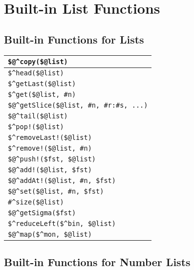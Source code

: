 \chapter{Built-in List Functions}

\section{Built-in Functions for \fsm{} Lists}

\begin{tabular}{|l|}
\hline
\verb!$@^copy($@list)! \\
\hline
\verb!$^head($@list)! \\
\verb!$^getLast($@list)! \\
\verb!$^get($@list, #n)! \\
\verb!$@^getSlice($@list, #n, #r:#s, ...)! \\
\verb!$@^tail($@list)! \\
\hline
\verb+$^pop!($@list)+ \\
\verb+$^removeLast!($@list)+ \\
\verb+$^remove!($@list, #n)+ \\
\hline
\verb+$@^push!($fst, $@list)+ \\
\verb+$@^add!($@list, $fst)+ \\
\verb+$@^addAt!($@list, #n, $fst)+ \\
\hline
\verb!$@^set($@list, #n, $fst)! \\
\hline
\verb!#^size($@list)! \\
\verb!$@^getSigma($fst)! \\
\hline
\verb!$^reduceLeft($^bin, $@list)! \\
\hline
\verb!$@^map($^mon, $@list)! \\
\hline
\end{tabular}

\section{Built-in Functions for Number Lists}

